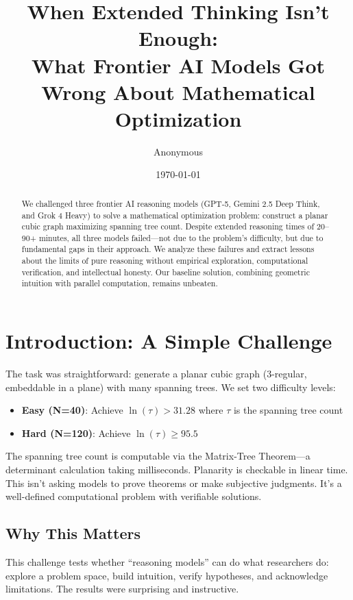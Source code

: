 \documentclass[11pt]{article}
\title{When Extended Thinking Isn't Enough:\\
What Frontier AI Models Got Wrong About Mathematical Optimization}
\author{Anonymous}
\date{\today}
\begin{document}
\maketitle

\begin{abstract}
We challenged three frontier AI reasoning models (GPT-5, Gemini 2.5 Deep Think, and Grok 4 Heavy) to solve a mathematical optimization problem: construct a planar cubic graph maximizing spanning tree count. Despite extended reasoning times of 20--90+ minutes, all three models failed---not due to the problem's difficulty, but due to fundamental gaps in their approach. We analyze these failures and extract lessons about the limits of pure reasoning without empirical exploration, computational verification, and intellectual honesty. Our baseline solution, combining geometric intuition with parallel computation, remains unbeaten.
\end{abstract}

\section{Introduction: A Simple Challenge}

The task was straightforward: generate a planar cubic graph (3-regular, embeddable in a plane) with many spanning trees. We set two difficulty levels:

\begin{itemize}
\item \textbf{Easy (N=40)}: Achieve $\ln(\tau) > 31.28$ where $\tau$ is the spanning tree count
\item \textbf{Hard (N=120)}: Achieve $\ln(\tau) \geq 95.5$
\end{itemize}

The spanning tree count is computable via the Matrix-Tree Theorem---a determinant calculation taking milliseconds. Planarity is checkable in linear time. This isn't asking models to prove theorems or make subjective judgments. It's a well-defined computational problem with verifiable solutions.

\subsection{Why This Matters}

This challenge tests whether ``reasoning models'' can do what researchers do: explore a problem space, build intuition, verify hypotheses, and acknowledge limitations. The results were surprising and instructive.
\end{document}
